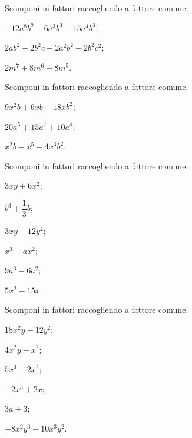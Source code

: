 \begin{esercizio}[\Ast]
\label{ese:13.3}
Scomponi in fattori raccogliendo a fattore comune.
\begin{multicols}{2}
\begin{enumeratea}
 \item $-12a^{8}b^{9}-6a^{3}b^{3}-15a^{4}b^{3}$;
 \item $2ab^{2}+2b^{2}c-2a^{2}b^{2}-2b^{2}c^{2}$;
 \item $2m^{7}+8m^{6}+8m^{5}$.
\end{enumeratea}
\end{multicols}
\end{esercizio}

\begin{esercizio}[\Ast]
\label{ese:13.4}
Scomponi in fattori raccogliendo a fattore comune.
\begin{multicols}{3}
\begin{enumeratea}
 \item $9x^{2}b+6xb+18xb^{2}$;
 \item $20a^{5}+15a^{7}+10a^{4}$;
 \item $x^{2}b-x^{5}-4x^{3}b^{2}$.
\end{enumeratea}
\end{multicols}
\end{esercizio}

\begin{esercizio}
\label{ese:13.5}
Scomponi in fattori raccogliendo a fattore comune.
\begin{multicols}{3}
\begin{enumeratea}
 \item $3xy+6x^{2}$;
 \item $b^{3}+\dfrac{1}{3}b$;
 \item $3xy-12y^{2}$;
 \item $x^{3}-ax^{2}$;
 \item $9a^{3}-6a^{2}$;
 \item $5x^{2}-15x$.
\end{enumeratea}
\end{multicols}
\end{esercizio}

\begin{esercizio}
\label{ese:13.6}
Scomponi in fattori raccogliendo a fattore comune.
\begin{multicols}{3}
\begin{enumeratea}
 \item $18x^{2}y-12y^{2}$;
 \item $4x^{2}y-x^{2}$;
 \item $5x^{3}-2x^{2}$;
 \item $-2x^{3}+2x$;
 \item $3a+3$;
 \item $-8x^{2}y^{3}-10x^{3}y^{2}$.
\end{enumeratea}
\end{multicols}
\end{esercizio}

